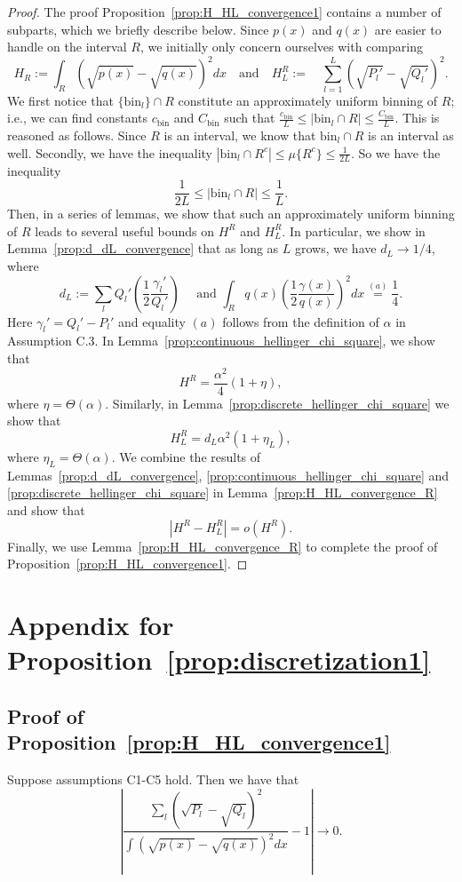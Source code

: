 \documentclass{article}
\newcommand{\bin}{\text{bin}}
\begin{document}
\begin{proof}
The proof Proposition~\ref{prop:H_HL_convergence1} contains a number of subparts, which we briefly describe below. Since $p(x)$ and $q(x)$ are easier to handle on the interval $R$, we initially only concern ourselves with comparing 
$$H_R := \int_R (\sqrt{p(x)} - \sqrt{q(x)})^2 dx \quad \text{and} \quad H^R_L := \quad \sum_{l=1}^L (\sqrt{{P}_l'} - \sqrt{{Q}_l'})^2.$$
We first notice that $\{ \bin_l \} \cap R$ constitute an approximately uniform binning of $R$; i.e., we can find constants $c_\bin$ and $C_\bin$ such that $\frac{c_\bin}{L} \leq |\bin_l \cap R| \leq \frac{C_\bin}{L}.$ This is reasoned as follows. Since $R$ is an interval, we know that $\bin_l \cap R$ is an interval as well. Secondly, we have the inequality $| \bin_l \cap R^c | \leq \mu\{ R^c \} \leq \frac{1}{2L}$. So we have the inequality 
$$\frac{1}{2L} \leq |\bin_l \cap R| \leq \frac{1}{L}.$$
Then, in a series of lemmas, we show that  such an approximately uniform binning of $R$ leads to several useful bounds on $H^R$ and $H^R_L$. In particular, we show in Lemma~\ref{prop:d_dL_convergence} that as long as $L$ grows, we have $d_L \to 1/4$, where
$$d_L := \sum_l Q_l' \left(\frac{1}{2} \frac{\gamma_l'}{Q_l'}\right) \quad \text{ and } \int_R q(x) \left(\frac{1}{2}\frac{\gamma(x)}{q(x)}\right)^2 dx \stackrel{(a)}= \frac{1}{4}.$$
Here $\gamma_l' = Q_l'-P_l'$ and equality $(a)$ follows from the definition of $\alpha$ in Assumption C.3. In Lemma~\ref{prop:continuous_hellinger_chi_square}, we show that 
$$H^R = \frac{\alpha^2}{4} (1+\eta),$$
where $\eta = \Theta(\alpha)$. Similarly, in Lemma~\ref{prop:discrete_hellinger_chi_square} we show that 
$$H^R_L = d_L\alpha^2(1+\eta_L),$$
where $\eta_L = \Theta(\alpha)$. We combine the results of Lemmas~\ref{prop:d_dL_convergence}, \ref{prop:continuous_hellinger_chi_square} and \ref{prop:discrete_hellinger_chi_square}  in Lemma~\ref{prop:H_HL_convergence_R} and show that 
$$|H^R-H^R_L| = o(H^R).$$
Finally, we use Lemma~\ref{prop:H_HL_convergence_R} to complete the proof of Proposition~\ref{prop:H_HL_convergence1}.
\end{proof}





\section{Appendix for Proposition~\ref{prop:discretization1}}

\subsection{Proof of Proposition~\ref{prop:H_HL_convergence1}}
\label{appendix: d1}
\begin{proposition}
\label{prop:H_HL_convergence1}
Suppose assumptions C1-C5 hold. Then we have that
\[
\left| \frac{
         \sum_l (\sqrt{P_l} - \sqrt{Q_l})^2 }{ \int (\sqrt{p(x)} - \sqrt{q(x)})^2 dx} - 1 \right| \rightarrow 0.
\] 
\end{proposition}
\end{document}
